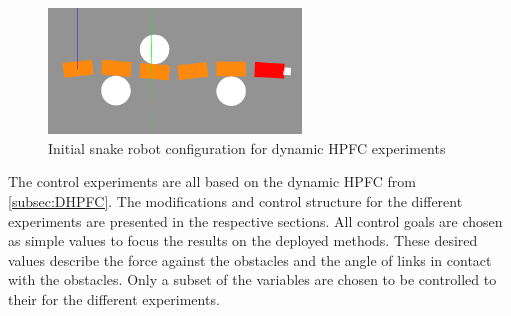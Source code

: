 \begin{figure}
    \centering
    \includegraphics[width=0.6\textwidth]{figures/experiments/initial-gazebo.png}
    \caption{Initial snake robot configuration for dynamic HPFC experiments}
    \label{fig:init-gazebo}
\end{figure}

The control experiments are all based on the dynamic HPFC from \ref{subsec:DHPFC}. The modifications and control structure for the different experiments are presented in the respective sections. All control goals are chosen as simple values to focus the results on the deployed methods. These desired values describe the force against the obstacles and the angle of links in contact with the obstacles. Only a subset of the variables are chosen to be controlled to their for the different experiments. 